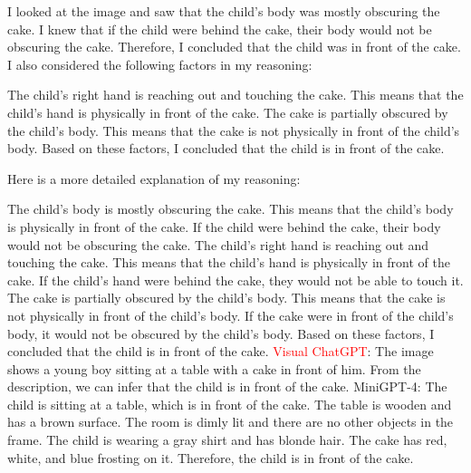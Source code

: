 \begin{enumerate}
        I looked at the image and saw that the child's body was mostly obscuring the cake.
        I knew that if the child were behind the cake, their body would not be obscuring the cake.
        Therefore, I concluded that the child was in front of the cake.
        I also considered the following factors in my reasoning:

        The child's right hand is reaching out and touching the cake. This means that the child's hand is physically in front of the cake.
        The cake is partially obscured by the child's body. This means that the cake is not physically in front of the child's body.
        Based on these factors, I concluded that the child is in front of the cake.

        Here is a more detailed explanation of my reasoning:

        The child's body is mostly obscuring the cake. This means that the child's body is physically in front of the cake. If the child were behind the cake, their body would not be obscuring the cake.
        The child's right hand is reaching out and touching the cake. This means that the child's hand is physically in front of the cake. If the child's hand were behind the cake, they would not be able to touch it.
        The cake is partially obscured by the child's body. This means that the cake is not physically in front of the child's body. If the cake were in front of the child's body, it would not be obscured by the child's body.
        Based on these factors, I concluded that the child is in front of the cake.
        \subitem \textcolor{red}{Visual ChatGPT}: The image shows a young boy sitting at a table with a cake in front of him. From the description, we can infer that the child is in front of the cake.
        \subitem MiniGPT-4: The child is sitting at a table, which is in front of the cake. The table is wooden and has a brown surface. The room is dimly lit and there are no other objects in the frame. The child is wearing a gray shirt and has blonde hair. The cake has red, white, and blue frosting on it. Therefore, the child is in front of the cake.
    \end{enumerate}
